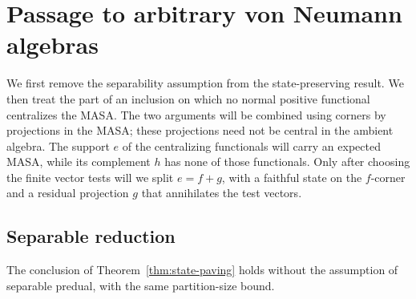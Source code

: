 \section{Passage to arbitrary von Neumann algebras}
\label{gen:section}

We first remove the separability assumption from the state-preserving
result. We then treat the part of an inclusion on which no normal
positive functional centralizes the MASA. The two arguments will be
combined using corners by projections in the MASA; these projections
need not be central in the ambient algebra. The support $e$ of the
centralizing functionals will carry an expected MASA, while its complement
$h$ has none of those functionals. Only after choosing the finite vector
tests will we split $e=f+g$, with a faithful state on the $f$-corner
and a residual projection $g$ that annihilates the test vectors.

\subsection{Separable reduction}

\begin{lemma}\label{lem:separable-reduction}
The conclusion of Theorem~\ref{thm:state-paving} holds without the
assumption of separable predual, with the same partition-size bound.
\end{lemma}

